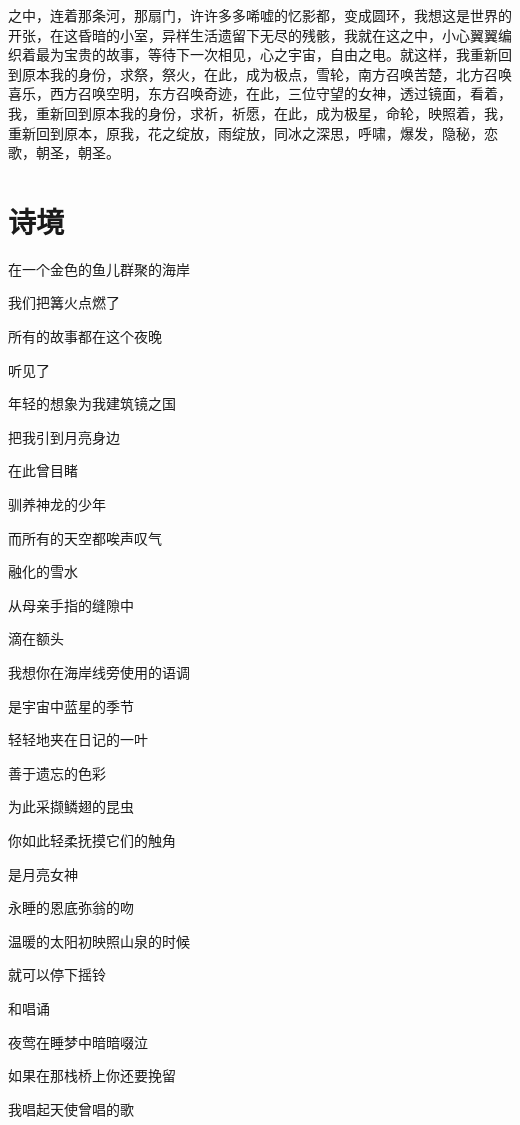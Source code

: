 \documentclass[UTF8]{article}
\begin{document}
之中，连着那条河，那扇门，许许多多唏嘘的忆影都，变成圆环，我想这是世界的开张，在这昏暗的小室，异样生活遗留下无尽的残骸，我就在这之中，小心翼翼编织着最为宝贵的故事，等待下一次相见，心之宇宙，自由之电。就这样，我重新回到原本我的身份，求祭，祭火，在此，成为极点，雪轮，南方召唤苦楚，北方召唤喜乐，西方召唤空明，东方召唤奇迹，在此，三位守望的女神，透过镜面，看着，我，重新回到原本我的身份，求祈，祈愿，在此，成为极星，命轮，映照着，我，重新回到原本，原我，花之绽放，雨绽放，同冰之深思，呼啸，爆发，隐秘，恋歌，朝圣，朝圣。
\section{诗境}
\par 在一个金色的鱼儿群聚的海岸
\par 我们把篝火点燃了
\par 所有的故事都在这个夜晚
\par 听见了
\\[0.6cm]
\par 年轻的想象为我建筑镜之国
\par 把我引到月亮身边
\par 在此曾目睹
\par 驯养神龙的少年
\\[0.6cm]
\par 而所有的天空都唉声叹气
\par 融化的雪水
\par 从母亲手指的缝隙中
\par 滴在额头
\\[0.6cm]
\par 我想你在海岸线旁使用的语调
\par 是宇宙中蓝星的季节
\par 轻轻地夹在日记的一叶
\par 善于遗忘的色彩
\\[0.6cm]
\par 为此采撷鳞翅的昆虫
\par 你如此轻柔抚摸它们的触角
\par 是月亮女神
\par 永睡的恩底弥翁的吻
\\[0.6cm]
\par 温暖的太阳初映照山泉的时候
\par 就可以停下摇铃
\par 和唱诵
\par 夜莺在睡梦中暗暗啜泣
\\[0.6cm]
\par 如果在那栈桥上你还要挽留
\par 我唱起天使曾唱的歌
\end{document}
